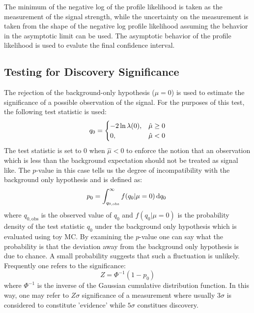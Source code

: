 The minimum of the negative log of the profile likelihood 
is taken as the measurement of the signal strength, while
the uncertainty on the measurement is taken from the shape of the 
negative log profile likelihood assuming the behavior in the asymptotic
limit can be used.  The asymptotic behavior of the profile likelihood 
is used to evalute the final confidence interval. 


\subsection{Testing for Discovery Significance}
The rejection of the background-only hypothesis ($\mu = 0$) is used 
to estimate the significance of a possible observation of the signal.
For the purposes of this test, the following test 
statistic is used:
\begin{equation}
q_{0} = 
\begin{cases}
\hfill -2 \ln \lambda(0),\hfill & \hat{\mu} \geq 0 \\
0,\hfill & \hat{\mu} < 0
\end{cases}
\label{eq:q0}
\end{equation}
The test statistic is set to $0$ when $\hat{\mu} < 0$ to enforce
the notion that an observation which is less than the background
expectation should not be treated as signal like. The $p$-value in this case
tells us the degree of incompatibility with the background only hypothesis
and is defined as:
\begin{equation}
p_0=\int^{\infty }_{q_{0,\textrm{obs}}} f(q_0|\mu=0) \mathop{}\!\mathrm{d}q_0~
\label{eq:pvalue}
\end{equation}
where $q_{0,\textrm{obs}}$ is the observed value of $q_0$ and 
$f(q_0|\mu=0)$ is the probability density of the test statistic $q_0$ under
the background only hypothesis which is evaluated using toy MC. %
By examining the $p$-value one can say what the probability is 
that the deviation away from the background only hypothesis is due
to chance. A small probability suggests that such a fluctuation is
unlikely. Frequently one refers to the significance:
\begin{equation}
Z = \Phi^{-1}(1-p_0)
\label{eq:significance}
\end{equation}
where $\Phi^{-1}$ is the inverse of the Gaussian cumulative distribution 
function.
In this way, one may refer to $Z\sigma$ significance of a measurement 
where usually
$3\sigma$ is considered to constitute 'evidence' while $5\sigma$ constitues
discovery.


